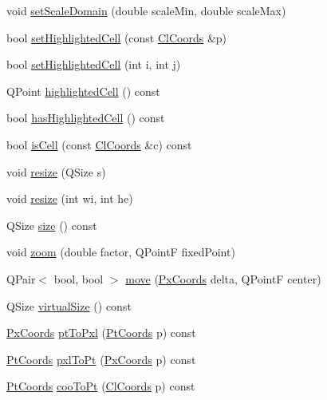 \begin{DoxyCompactItemize}
void \hyperlink{class_map_painter_afaed21e6944cf1e62398f3f7a0067999}{set\-Scale\-Domain} (double scale\-Min, double scale\-Max)
\item 
bool \hyperlink{class_map_painter_ad7effe1c69fb1409d696dd54edd8bbb3}{set\-Highlighted\-Cell} (const \hyperlink{class_cl_coords}{\-Cl\-Coords} \&p)
\item 
bool \hyperlink{class_map_painter_a49c452342b60a341e7b3530141adeda8}{set\-Highlighted\-Cell} (int i, int j)
\item 
\-Q\-Point \hyperlink{class_map_painter_a528513a51ae87cce652e310587e59f9c}{highlighted\-Cell} () const 
\item 
bool \hyperlink{class_map_painter_ab0f0c512388d95b78d1118af8342fd16}{has\-Highlighted\-Cell} () const 
\item 
bool \hyperlink{class_map_painter_a9d4b59ef444017715bc0d1b4dc1e9d5f}{is\-Cell} (const \hyperlink{class_cl_coords}{\-Cl\-Coords} \&c) const 
\item 
void \hyperlink{class_map_painter_ae215f704c3f1ee11bb89861b9b4b13d3}{resize} (\-Q\-Size s)
\item 
void \hyperlink{class_map_painter_a3280e72c6ffed5e7c550d4632a6de794}{resize} (int wi, int he)
\item 
\-Q\-Size \hyperlink{class_map_painter_a3ae925af3a8a14a83f70b8cbd8c22158}{size} () const 
\item 
void \hyperlink{class_map_painter_a2dacde51513a54fbbf45b44787cd0ee2}{zoom} (double factor, \-Q\-Point\-F fixed\-Point)
\item 
\-Q\-Pair$<$ bool, bool $>$ \hyperlink{class_map_painter_a55dd52865ad3f50b91dadd1f1b6f9352}{move} (\hyperlink{class_px_coords}{\-Px\-Coords} delta, \-Q\-Point\-F center)
\item 
\-Q\-Size \hyperlink{class_map_painter_ac83fce82c6257bd251bc8cd37419af56}{virtual\-Size} () const 
\item 
\hyperlink{class_px_coords}{\-Px\-Coords} \hyperlink{class_map_painter_ac9c2bb380681752eecdd66037ca73192}{pt\-To\-Pxl} (\hyperlink{class_pt_coords}{\-Pt\-Coords} p) const 
\item 
\hyperlink{class_pt_coords}{\-Pt\-Coords} \hyperlink{class_map_painter_af659a9c0dc9d9cd160dafc3aaef9974b}{pxl\-To\-Pt} (\hyperlink{class_px_coords}{\-Px\-Coords} p) const 
\item 
\hyperlink{class_pt_coords}{\-Pt\-Coords} \hyperlink{class_map_painter_a80a2a8fb072ef7e672369a07bb46b059}{coo\-To\-Pt} (\hyperlink{class_cl_coords}{\-Cl\-Coords} p) const 
\item 

\end{DoxyCompactItemize}
